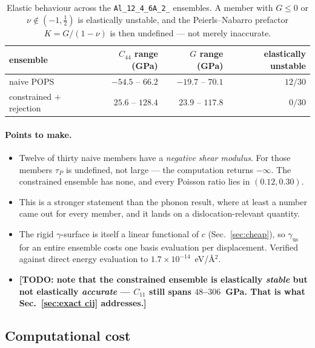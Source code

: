 \documentclass{article}
\newcommand{\TODO}[1]{{\color{blue}\textbf{[TODO: #1]}}}
\newcommand{\code}[1]{\texttt{\small #1}}
\begin{document}
\begin{table}[h]
\centering
\caption{Elastic behaviour across the \code{Al\_12\_4\_6A\_2\_} ensembles. A member
with $G\le0$ or $\nu\notin(-1,\tfrac12)$ is elastically unstable, and the
Peierls--Nabarro prefactor $K = G/(1-\nu)$ is then undefined --- not merely
inaccurate.}
\begin{tabular}{lrrr}
\toprule
ensemble & $C_{44}$ range (GPa) & $G$ range (GPa) & elastically unstable \\
\midrule
naive POPS                & $-54.5$ -- $66.2$ & $-19.7$ -- $70.1$ & $12/30$ \\
constrained $+$ rejection & $\phantom{-}25.6$ -- $128.4$ & $\phantom{-}23.9$ -- $117.8$ & $0/30$ \\
\bottomrule
\end{tabular}
\label{tab:elastic stability}
\end{table}

\paragraph{Points to make.}
\begin{itemize}
  \item Twelve of thirty naive members have a \emph{negative shear modulus}. For those members $\tau_P$ is undefined, not large --- the computation returns $-\infty$. The constrained ensemble has none, and every Poisson ratio lies in $(0.12,0.30)$.
  \item This is a stronger statement than the phonon result, where at least a number came out for every member, and it lands on a dislocation-relevant quantity.
  \item The rigid $\gamma$-surface is itself a linear functional of $c$ (Sec.~\ref{sec:cheap}), so $\gamma_{\mathrm{us}}$ for an entire ensemble costs one basis evaluation per displacement. Verified against direct energy evaluation to $1.7\times10^{-14}$~eV/\AA$^2$.
  \item \TODO{note that the constrained ensemble is elastically \emph{stable} but not elastically \emph{accurate} --- $C_{11}$ still spans $48$--$306$~GPa. That is what Sec.~\ref{sec:exact cij} addresses.}
\end{itemize}

\subsection{Computational cost}
\end{document}
